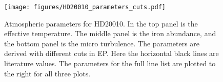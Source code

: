 \documentclass{aa}
\begin{document}
\begin{figure}[tpb!]
    \centering
    \texttt{[image: figures/HD20010\_parameters\_cuts.pdf]}
    \caption{Atmospheric parameters for HD20010. In the top panel is the
    effective temperature. The middle panel is the iron abundance, and the
    bottom panel is the micro turbulence. The parameters are derived with
    different cuts in EP. Here the horizontal black lines are literature values.
    The parameters for the full line list are plotted to the right for all
    three plots.}
    \label{fig:HD20010_parameters_cuts}
\end{figure}











\newpage


\nocite*{}
\end{document}
